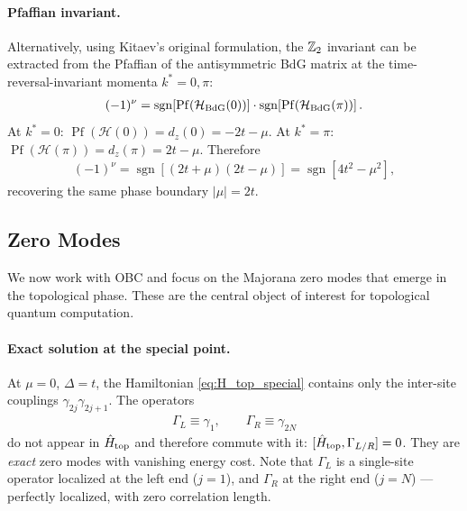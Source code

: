 \paragraph{Pfaffian invariant.}
Alternatively, using Kitaev's original formulation, the $\mathbb{Z}_2$ invariant can be extracted from the Pfaffian of the antisymmetric BdG matrix at the time-reversal-invariant momenta $k^* = 0, \pi$:
\begin{align}
    (-1)^{\nu} = \operatorname{sgn}\!\left[\operatorname{Pf}\!\left(\mathcal{H}_{\rm BdG}(0)\right)\right]\cdot\operatorname{sgn}\!\left[\operatorname{Pf}\!\left(\mathcal{H}_{\rm BdG}(\pi)\right)\right].
\end{align}
At $k^* = 0$: $\operatorname{Pf}(\mathcal{H}(0)) = d_z(0) = -2t - \mu$. At $k^* = \pi$: $\operatorname{Pf}(\mathcal{H}(\pi)) = d_z(\pi) = 2t - \mu$. Therefore
\begin{align}
    (-1)^{\nu} = \operatorname{sgn}\!\left[(2t + \mu)(2t - \mu)\right] = \operatorname{sgn}\!\left[4t^2 - \mu^2\right],
\end{align}
recovering the same phase boundary $|\mu| = 2t$.

\subsection{Zero Modes}
\label{sec:zeromodes}

We now work with OBC and focus on the Majorana zero modes that emerge in the topological phase. These are the central object of interest for topological quantum computation.

\paragraph{Exact solution at the special point.}
At $\mu = 0$, $\Delta = t$, the Hamiltonian \eqref{eq:H_top_special} contains only the inter-site couplings $\gamma_{2j}\gamma_{2j+1}$. The operators
\begin{align}
    \Gamma_L \equiv \gamma_1, \qquad \Gamma_R \equiv \gamma_{2N}
    \label{eq:zm_special}
\end{align}
do not appear in $\hat{H}_{\rm top}$ and therefore commute with it: $[\hat{H}_{\rm top},\Gamma_{L/R}] = 0$. They are \emph{exact} zero modes with vanishing energy cost. Note that $\Gamma_L$ is a single-site operator localized at the left end ($j=1$), and $\Gamma_R$ at the right end ($j=N$) — perfectly localized, with zero correlation length.

